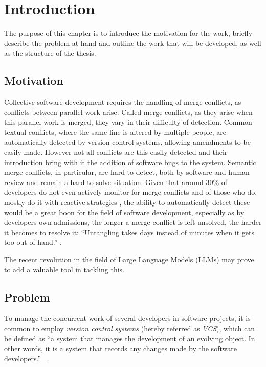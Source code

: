 \chapter{Introduction} \label{chap:intro}

The purpose of this chapter is to introduce the motivation for the work, briefly describe the problem at hand and outline the work that will be developed, as well as the structure of the thesis.

\section{Motivation} \label{sec:motivation}

Collective software development requires the handling of merge conflicts, as conflicts between parallel work arise. Called merge conflicts, as they arise when this parallel work is merged, they vary in their difficulty of detection.
Common textual conflicts, where the same line is altered by multiple people, are automatically detected by version control systems, allowing amendments to be easily made. However not all conflicts are this easily detected and their introduction bring with it the addition of software bugs to the system. Semantic merge conflicts, in particular, are hard to detect, both by software and human review and remain a hard to solve situation. Given that around 30\% of developers do not even actively monitor for merge conflicts and of those who do, mostly do it with reactive strategies \citep{kn:lifecycle}, the ability to automatically detect these would be a great boon for the field of software development, especially as by developers own admissions, the longer a merge conflict is left unsolved, the harder it becomes to resolve it: “Untangling takes days instead of minutes when it gets too out of hand.” \citep{kn:lifecycle}.

The recent revolution in the field of Large Language Models (LLMs) may prove to add a valuable tool in tackling this.


\section{Problem} \label{sec:problem}

To manage the concurrent work of several developers in software projects, it is common to employ \emph{version control systems} (hereby referred as \emph{VCS}), which can be defined as ``a system that manages the development of an evolving object. In other words, it is a system that records any changes made by the software developers.'' ~\citep{kn:vers_review}.

